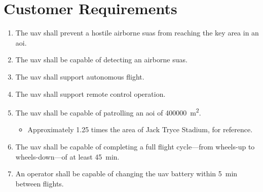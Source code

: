 \chapter{Customer Requirements}\label{cp:customer_reqs}

\begin{enumerate}
    \item The \acrshort{uav} shall prevent a hostile airborne \acrshort{suas} from reaching the key area in an \acrshort{aoi}.
    \item The \acrshort{uav} shall be capable of detecting an airborne \acrshort{suas}.
    \item The \acrshort{uav} shall support autonomous flight.
    \item The \acrshort{uav} shall support remote control operation.
    \item The \acrshort{uav} shall be capable of patrolling an \acrshort{aoi} of \qty{400000}{\meter\squared}.
        \begin{itemize}
            \item Approximately \num{1.25} times the area of Jack Tryce Stadium, for reference.
        \end{itemize}
    \item The \acrshort{uav} shall be capable of completing a full flight cycle—from wheels-up to wheels-down—of at least \qty{45}{\minute}.
    \item An operator shall be capable of changing the \acrshort{uav} battery within \qty{5}{\minute} between flights.
\end{enumerate}